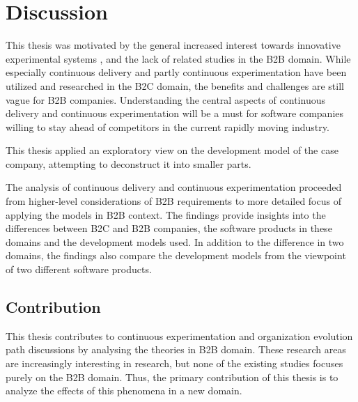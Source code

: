 \documentclass[english]{tktltiki2}
\theoremstyle{definition}
\theoremstyle{remark}
\begin{document}



\section{Discussion}
This thesis was motivated by the general increased interest towards innovative experimental systems \cite{olsson2012climbing}, and the lack of related studies in the B2B domain. While especially continuous delivery and partly continuous experimentation have been utilized and researched in the B2C domain, the benefits and challenges are still vague for B2B companies. Understanding the central aspects of continuous delivery and continuous experimentation will be a must for software companies willing to stay ahead of competitors in the current rapidly moving industry.

This thesis applied an exploratory view on the development model of the case company, attempting to deconstruct it into smaller parts. 

The analysis of continuous delivery and continuous experimentation proceeded from higher-level considerations of B2B requirements to more detailed focus of applying the models in B2B context. The findings provide insights into the differences between B2C and B2B companies, the software products in these domains and the development models used. In addition to the difference in two domains, the findings also compare the development models from the viewpoint of two different software products.


\subsection{Contribution}
This thesis contributes to continuous experimentation \cite{fagerholm2014building} and organization evolution path \cite{olsson2012climbing} discussions by analysing the theories in B2B domain. These research areas are increasingly interesting in research, but none of the existing studies focuses purely on the B2B domain. Thus, the primary contribution of this thesis is to analyze the effects of this phenomena in a new domain.
\end{document}
